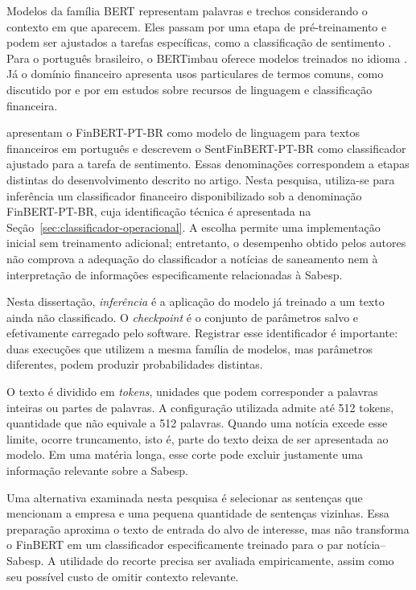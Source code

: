 Modelos da família BERT representam palavras e trechos considerando o contexto em que aparecem. Eles passam por uma etapa de pré-treinamento e podem ser ajustados a tarefas específicas, como a classificação de sentimento \cite{devlin2019bert}. Para o português brasileiro, o BERTimbau oferece modelos treinados no idioma \cite{souza2020bertimbau}. Já o domínio financeiro apresenta usos particulares de termos comuns, como discutido por  e por  em estudos sobre recursos de linguagem e classificação financeira.

 apresentam o FinBERT-PT-BR como modelo de linguagem para textos financeiros em português e descrevem o SentFinBERT-PT-BR como classificador ajustado para a tarefa de sentimento. Essas denominações correspondem a etapas distintas do desenvolvimento descrito no artigo. Nesta pesquisa, utiliza-se para inferência um classificador financeiro disponibilizado sob a denominação FinBERT-PT-BR, cuja identificação técnica é apresentada na Seção~\ref{sec:classificador-operacional}. A escolha permite uma implementação inicial sem treinamento adicional; entretanto, o desempenho obtido pelos autores não comprova a adequação do classificador a notícias de saneamento nem à interpretação de informações especificamente relacionadas à Sabesp.

Nesta dissertação, \emph{inferência} é a aplicação do modelo já treinado a um texto ainda não classificado. O \emph{checkpoint} é o conjunto de parâmetros salvo e efetivamente carregado pelo software. Registrar esse identificador é importante: duas execuções que utilizem a mesma família de modelos, mas parâmetros diferentes, podem produzir probabilidades distintas.

O texto é dividido em \emph{tokens}, unidades que podem corresponder a palavras inteiras ou partes de palavras. A configuração utilizada admite até 512 tokens, quantidade que não equivale a 512 palavras. Quando uma notícia excede esse limite, ocorre truncamento, isto é, parte do texto deixa de ser apresentada ao modelo. Em uma matéria longa, esse corte pode excluir justamente uma informação relevante sobre a Sabesp.

Uma alternativa examinada nesta pesquisa é selecionar as sentenças que mencionam a empresa e uma pequena quantidade de sentenças vizinhas. Essa preparação aproxima o texto de entrada do alvo de interesse, mas não transforma o FinBERT em um classificador especificamente treinado para o par notícia--Sabesp. A utilidade do recorte precisa ser avaliada empiricamente, assim como seu possível custo de omitir contexto relevante.

